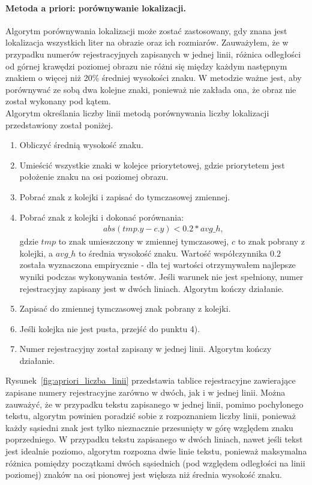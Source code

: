 \paragraph{Metoda a priori: porównywanie lokalizacji.} Algorytm porównywania lokalizacji może zostać zastosowany, gdy znana jest lokalizacja wszystkich liter na obrazie oraz ich rozmiarów. Zauważyłem, że w przypadku numerów rejestracyjnych zapisanych w jednej linii, różnica odległości od górnej krawędzi poziomej obrazu nie różni się między każdym następnym znakiem o więcej niż 20\% średniej wysokości znaku. W metodzie ważne jest, aby porównywać ze sobą dwa kolejne znaki, ponieważ nie zakłada ona, że obraz nie został wykonany pod kątem.\\
Algorytm określania liczby linii metodą porównywania liczby lokalizacji przedstawiony został poniżej.
\begin{enumerate}
  \item Obliczyć średnią wysokość znaku.
  \item Umieścić wszystkie znaki w kolejce priorytetowej, gdzie priorytetem jest położenie znaku na osi poziomej obrazu.
  \item Pobrać znak z kolejki i zapisać do tymczasowej zmiennej.
  \item Pobrać znak z kolejki i dokonać porównania:
    \begin{gather*}
      abs(tmp.y - c.y) < 0.2*avg\_h,
    \end{gather*}
    gdzie $tmp$ to znak umieszczony w zmiennej tymczasowej, $c$ to znak pobrany z kolejki, a $avg\_h$ to średnia wysokość znaku. Wartość współczynnika $0.2$ została wyznaczona empirycznie - dla tej wartości otrzymywałem najlepsze wyniki podczas wykonywania testów. Jeśli warunek nie jest spełniony, numer rejestracyjny zapisany jest w dwóch liniach. Algorytm kończy działanie.
  \item Zapisać do zmiennej tymczasowej znak pobrany z kolejki.
  \item Jeśli kolejka nie jest pusta, przejść do punktu 4).
  \item Numer rejestracyjny został zapisany w jednej linii. Algorytm kończy działanie.
\end{enumerate}
Rysunek~\ref{fig:apriori_liczba_linii} przedstawia tablice rejestracyjne zawierające zapisane numery rejestracyjne zarówno w dwóch, jak i w jednej linii. Można zauważyć, że w przypadku tekstu zapisanego w jednej linii, pomimo pochylonego tekstu, algorytm powinien poradzić sobie z rozpoznaniem liczby linii, ponieważ każdy sąsiedni znak jest tylko nieznacznie przesunięty w górę względem znaku poprzedniego. W przypadku tekstu zapisanego w dwóch liniach, nawet jeśli tekst jest idealnie poziomo, algorytm rozpozna dwie linie tekstu, ponieważ maksymalna różnica pomiędzy początkami dwóch sąsiednich (pod względem odległości na linii poziomej) znaków na osi pionowej jest większa niż średnia wysokość znaku.

